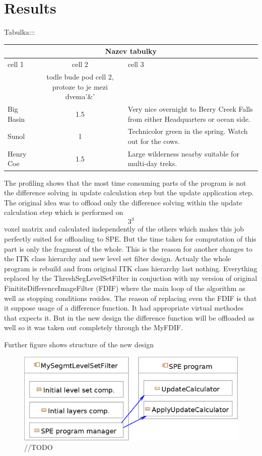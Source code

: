 \chapter{Results}
Tabulka:::
\begin{center}
\begin{tabular}{|l|c|p{3.5in}|}
\hline
\multicolumn{3}{|c|}{Nazev tabulky}\\ 
\hline cell 1&cell 2&cell 3\\&todle bude pod cell 2, protoze to je mezi dvema'\&' &\\ 
\hline Big Basin&1.5&Very nice overnight to Berry Creek Falls from
either Headquarters or ocean side.\\ 
\hline Sunol&1&Technicolor green in the spring. Watch out for the cows.\\ 
\hline Henry Coe&1.5&Large wilderness nearby suitable for multi-day treks.\\ 
\hline
\end{tabular}
\end{center}

The profiling shows that the most time consuming parts of the program is not the difference solving in update calculation step but the update application step. The original idea was to offload only the difference solving within the update calculation step which is performed on $$3^3$$ voxel matrix and calculated independently of the others which makes this job perfectly suited for offloading to SPE. But the time taken for computation of this part is only the fragment of the whole. This is the reason for another changes to the ITK class hierarchy and new level set filter design. Actualy the whole program is rebuild and from original ITK class hierarchy last nothing. Everything replaced by the ThreshSegLevelSetFilter in conjuction with my version of original FinititeDifferenceImageFilter (FDIF) where the main loop of the algorithm as well as stopping conditions resides. The reason of replacing even the FDIF is that it suppose usage of a difference function. It had appropriate virtual methodes that expects it. But in the new design the difference function will be offloaded as well so it was taken out completely through the MyFDIF.

Further figure shows structure of the new design

\begin{figure}
    \centering
    \includegraphics[width=15cm]{data/newDesign.eps}
    \caption[Diagram of new design components]{//TODO}
    \label{fg:newDesign}
\end{figure}

